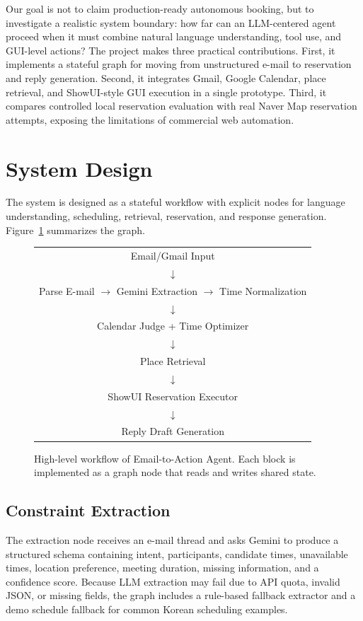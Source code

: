 \documentclass[sigconf,nonacm]{acmart}
\begin{document}
Our goal is not to claim production-ready autonomous booking, but to investigate a realistic system boundary: how far can an LLM-centered agent proceed when it must combine natural language understanding, tool use, and GUI-level actions? The project makes three practical contributions. First, it implements a stateful graph for moving from unstructured e-mail to reservation and reply generation. Second, it integrates Gmail, Google Calendar, place retrieval, and ShowUI-style GUI execution in a single prototype. Third, it compares controlled local reservation evaluation with real Naver Map reservation attempts, exposing the limitations of commercial web automation.

\section{System Design}
The system is designed as a stateful workflow with explicit nodes for language understanding, scheduling, retrieval, reservation, and response generation. Figure~\ref{fig:workflow} summarizes the graph.

\begin{figure}[t]
\centering
\small
\begin{tabular}{c}
\toprule
Email/Gmail Input \\
$\downarrow$ \\
Parse E-mail $\rightarrow$ Gemini Extraction $\rightarrow$ Time Normalization \\
$\downarrow$ \\
Calendar Judge + Time Optimizer \\
$\downarrow$ \\
Place Retrieval \\
$\downarrow$ \\
ShowUI Reservation Executor \\
$\downarrow$ \\
Reply Draft Generation \\
\bottomrule
\end{tabular}
\caption{High-level workflow of Email-to-Action Agent. Each block is implemented as a graph node that reads and writes shared state.}
\label{fig:workflow}
\end{figure}

\subsection{Constraint Extraction}
The extraction node receives an e-mail thread and asks Gemini to produce a structured schema containing intent, participants, candidate times, unavailable times, location preference, meeting duration, missing information, and a confidence score. Because LLM extraction may fail due to API quota, invalid JSON, or missing fields, the graph includes a rule-based fallback extractor and a demo schedule fallback for common Korean scheduling examples.
\end{document}
